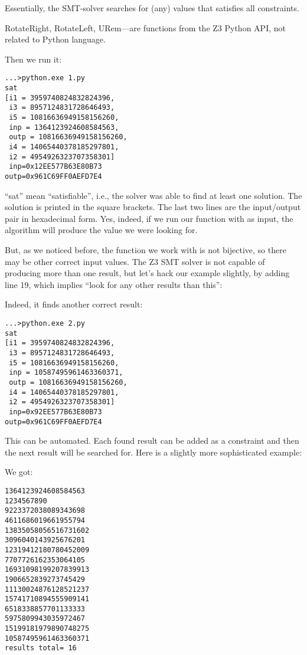 Essentially, the \ac{SMT}-solver searches for (any) values that satisfies all constraints.

RotateRight, RotateLeft, URem---are functions from the Z3 Python API, not related to Python language.

Then we run it:

\begin{lstlisting}
...>python.exe 1.py
sat
[i1 = 3959740824832824396,
 i3 = 8957124831728646493,
 i5 = 10816636949158156260,
 inp = 1364123924608584563,
 outp = 10816636949158156260,
 i4 = 14065440378185297801,
 i2 = 4954926323707358301]
 inp=0x12EE577B63E80B73
outp=0x961C69FF0AEFD7E4
\end{lstlisting}

``sat'' mean ``satisfiable'', i.e., the solver was able to find at least one solution.
The solution is printed in the square brackets.
The last two lines are the input/output pair in hexadecimal form.
Yes, indeed, if we run our function with  as input, the algorithm will produce the value we were looking for.

But, as we noticed before, the function we work with is not bijective, so there may be other correct input values.
The Z3 \ac{SMT} solver is not capable of producing more than one result, but let's hack our example slightly, 
by adding line 19, which implies ``look for any other results than this'':



Indeed, it finds another correct result:

\begin{lstlisting}
...>python.exe 2.py
sat
[i1 = 3959740824832824396,
 i3 = 8957124831728646493,
 i5 = 10816636949158156260,
 inp = 10587495961463360371,
 outp = 10816636949158156260,
 i4 = 14065440378185297801,
 i2 = 4954926323707358301]
 inp=0x92EE577B63E80B73
outp=0x961C69FF0AEFD7E4
\end{lstlisting}

This can be automated.
Each found result can be added as a constraint and then the next result will be searched for.
Here is a slightly more sophisticated example:



We got:

\begin{lstlisting}
1364123924608584563
1234567890
9223372038089343698
4611686019661955794
13835058056516731602
3096040143925676201
12319412180780452009
7707726162353064105
16931098199207839913
1906652839273745429
11130024876128521237
15741710894555909141
6518338857701133333
5975809943035972467
15199181979890748275
10587495961463360371
results total= 16
\end{lstlisting}

